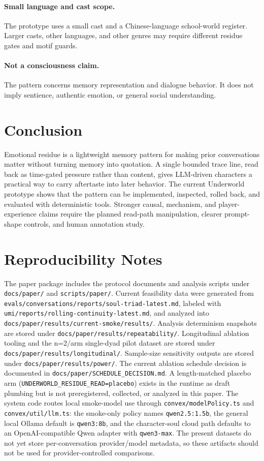 \documentclass[11pt]{article}
\begin{document}
\paragraph{Small language and cast scope.}
The prototype uses a small cast and a Chinese-language school-world register. Larger casts, other languages, and other genres may require different residue gates and motif guards.

\paragraph{Not a consciousness claim.}
The pattern concerns memory representation and dialogue behavior. It does not imply sentience, authentic emotion, or general social understanding.

\section{Conclusion}

Emotional residue is a lightweight memory pattern for making prior conversations matter without turning memory into quotation. A single bounded trace line, read back as time-gated pressure rather than content, gives LLM-driven characters a practical way to carry aftertaste into later behavior. The current Underworld prototype shows that the pattern can be implemented, inspected, rolled back, and evaluated with deterministic tools. Stronger causal, mechanism, and player-experience claims require the planned read-path manipulation, clearer prompt-shape controls, and human annotation study.

\section*{Reproducibility Notes}

The paper package includes the protocol documents and analysis scripts under \texttt{docs/paper/} and \texttt{scripts/paper/}. Current feasibility data were generated from \texttt{evals/conversations/reports/soul-triad-latest.md}, labeled with \texttt{umi/reports/rolling-continuity-latest.md}, and analyzed into \texttt{docs/paper/results/current-smoke/results/}. Analysis determinism snapshots are stored under \texttt{docs/paper/results/repeatability/}. Longitudinal ablation tooling and the n=2/arm single-dyad pilot dataset are stored under \texttt{docs/paper/results/longitudinal/}. Sample-size sensitivity outputs are stored under \texttt{docs/paper/results/power/}. The current ablation schedule decision is documented in \texttt{docs/paper/SCHEDULE_DECISION.md}. A length-matched placebo arm (\texttt{UNDERWORLD\_RESIDUE\_READ=placebo}) exists in the runtime as draft plumbing but is not preregistered, collected, or analyzed in this paper. The system code routes local smoke-model use through \texttt{convex/modelPolicy.ts} and \texttt{convex/util/llm.ts}: the smoke-only policy names \texttt{qwen2.5:1.5b}, the general local Ollama default is \texttt{qwen3:8b}, and the character-soul cloud path defaults to an OpenAI-compatible Qwen adapter with \texttt{qwen3-max}. The present datasets do not yet store per-conversation provider/model metadata, so these artifacts should not be used for provider-controlled comparisons.
\end{document}
